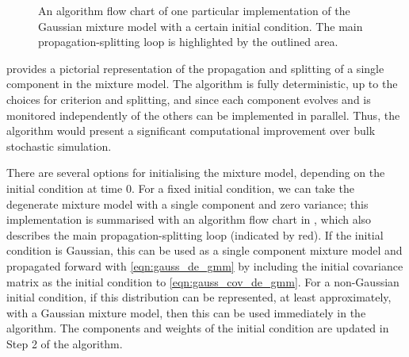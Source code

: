 \begin{figure}
	\caption{An algorithm flow chart of one particular implementation of the Gaussian mixture model with a certain initial condition.
		The main propagation-splitting loop is highlighted by the outlined area.}
	\label{fig:gmm_alg_diag}
\end{figure}

 provides a pictorial representation of the propagation and splitting of a single component in the mixture model.
The algorithm is fully deterministic, up to the choices for criterion and splitting, and since each component evolves and is monitored independently of the others can be implemented in parallel.
Thus, the algorithm would present a significant computational improvement over bulk stochastic simulation.


There are several options for initialising the mixture model, depending on the initial condition at time \(0\).
For a fixed initial condition, we can take the degenerate mixture model with a single component and zero variance; this implementation is summarised with an algorithm flow chart in , which also describes the main propagation-splitting loop (indicated by red).
If the initial condition is Gaussian, this can be used as a single component mixture model and propagated forward with \cref{eqn:gauss_de_gmm} by including the initial covariance matrix as the initial condition to \cref{eqn:gauss_cov_de_gmm}.
For a non-Gaussian initial condition, if this distribution can be represented, at least approximately, with a Gaussian mixture model, then this can be used immediately in the algorithm.
The components and weights of the initial condition are updated in Step 2 of the algorithm.

